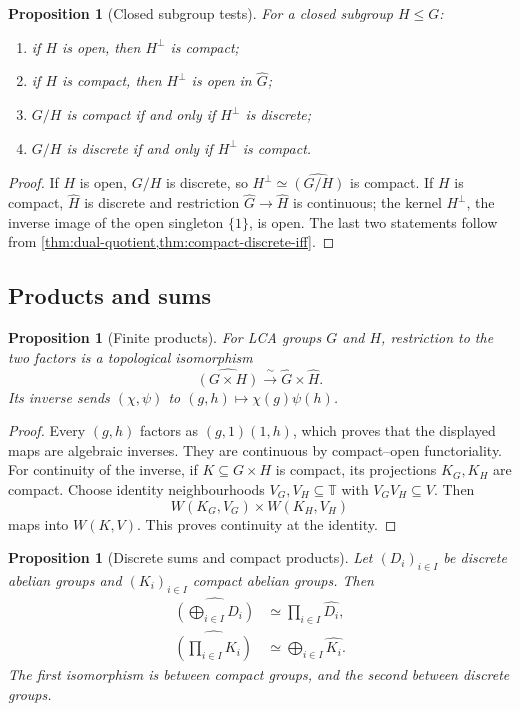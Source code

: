 \documentclass[11pt]{article}
\newtheorem{proposition}[theorem]{Proposition}
\theoremstyle{definition}
\theoremstyle{remark}
\newcommand{\T}{\mathbb T}
\newcommand{\dual}[1]{\widehat{#1}}
\begin{document}
\begin{proposition}[Closed subgroup tests]
\label{prop:annihilator-compact-open}
For a closed subgroup $H\leq G$:
\begin{enumerate}[label=(\alph*)]
\item if $H$ is open, then $H^\perp$ is compact;
\item if $H$ is compact, then $H^\perp$ is open in $\dual G$;
\item $G/H$ is compact if and only if $H^\perp$ is discrete;
\item $G/H$ is discrete if and only if $H^\perp$ is compact.
\end{enumerate}
\end{proposition}

\begin{proof}
If $H$ is open, $G/H$ is discrete, so
$H^\perp\simeq\dual{(G/H)}$ is compact.  If $H$ is compact, $\dual H$ is discrete and
restriction $\dual G\to\dual H$ is continuous; the kernel $H^\perp$, the inverse image
of the open singleton $\{1\}$, is open.  The last two statements follow from
\cref{thm:dual-quotient,thm:compact-discrete-iff}.
\end{proof}

\subsection{Products and sums}

\begin{proposition}[Finite products]
\label{prop:dual-finite-product}
For LCA groups $G$ and $H$, restriction to the two factors is a topological isomorphism
\[
  \dual{(G\times H)}\xrightarrow{\ \sim\ }\dual G\times\dual H.
\]
Its inverse sends $(\chi,\psi)$ to $(g,h)\mapsto\chi(g)\psi(h)$.
\end{proposition}

\begin{proof}
Every $(g,h)$ factors as $(g,1)(1,h)$, which proves that the displayed maps are
algebraic inverses.  They are continuous by compact--open functoriality.  For continuity
of the inverse, if $K\subseteq G\times H$ is compact, its projections $K_G,K_H$ are
compact.  Choose identity neighbourhoods $V_G,V_H\subseteq\T$ with
$V_GV_H\subseteq V$.  Then
\[
  W(K_G,V_G)\times W(K_H,V_H)
\]
maps into $W(K,V)$.  This proves continuity at the identity.
\end{proof}

\begin{proposition}[Discrete sums and compact products]
\label{prop:dual-sum-product}
Let $(D_i)_{i\in I}$ be discrete abelian groups and $(K_i)_{i\in I}$ compact abelian
groups.  Then
\begin{align}
 \dual{\left(\bigoplus_{i\in I}D_i\right)}
   &\simeq\prod_{i\in I}\dual{D_i},
 \label{eq:dual-direct-sum}\\
 \dual{\left(\prod_{i\in I}K_i\right)}
   &\simeq\bigoplus_{i\in I}\dual{K_i}.
 \label{eq:dual-compact-product}
\end{align}
The first isomorphism is between compact groups, and the second between discrete groups.
\end{proposition}
\end{document}
